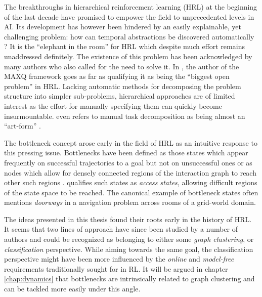 The breakthroughs in hierarchical reinforcement learning (HRL) at the beginning of the last decade have promised to empower the field  to unprecedented levels in AI. Its development has however been hindered by an easily explainable, yet challenging problem: how can temporal abstractions be discovered automatically ? It is the ``elephant in the room'' for HRL which despite much effort remains unaddressed definitely. The existence of this problem has been acknowledged by many authors who also called for the need to solve it. In \cite{Dietterich2000}, the author of the \textsc{MAXQ} framework  goes as far as qualifying it as being the ``biggest open problem'' in HRL. Lacking automatic methods for decomposing the problem structure into simpler sub-problems, hierarchical approaches are of limited interest as the effort for manually specifying them can quickly become insurmountable. \cite{Hengst2002} even refers to manual task decomposition as being almost an ``art-form'' .

The bottleneck concept arose early in the field of HRL as an intuitive response to this pressing issue. Bottlenecks have been defined as those states which appear frequently on successful trajectories to a goal but not on unsuccessful ones \parencite{Mcgovern2001, Stolle2002} or as nodes which allow for densely connected regions of the interaction graph to reach other such regions \parencite{Menache2002, Simsek2004, Kazemitabar2009}. \cite{Simsek2004} qualifies such states as \textit{access states}, allowing difficult regions of the state space to be reached. The canonical example of bottleneck states often mentions \textit{doorways} in a navigation problem across rooms of a grid-world domain.

The ideas presented in this thesis found their roots early in the history of HRL. It seems that two lines of approach have since been studied by a number of authors and could be recognized as belonging to either some \textit{graph clustering}, or  \textit{classification} perspective. While aiming towards the same goal, the classification perspective might have been more influenced by the \textit{online} and \textit{model-free} requirements  traditionally sought for in RL. It will be argued in chapter \ref{chap:dynamics}  that bottlenecks are intrinsically related to graph clustering and can be tackled more easily under this angle. 

